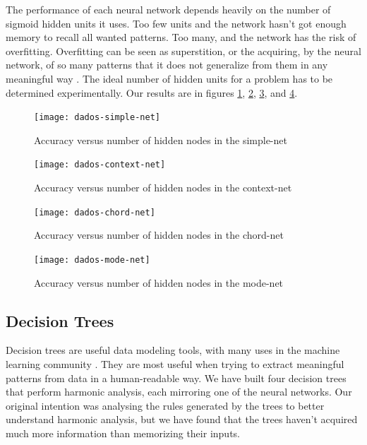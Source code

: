 \documentclass{article}
\begin{document}
The performance of each neural network depends heavily on the number
of sigmoid hidden units it uses. Too few units and the network hasn't
got enough memory to recall all wanted patterns. Too many, and the
network has the risk of overfitting. Overfitting can be seen as
superstition, or the acquiring, by the neural network, of so many
patterns that it does not generalize from them in any meaningful way
\cite{white95:superstitious}. The ideal number of hidden units for a
problem has to be determined experimentally. Our results are in
figures \ref{fig:simple-net}, \ref{fig:context-net},
\ref{fig:chord-net}, and \ref{fig:mode-net}.

\begin{figure}
  \texttt{[image: dados-simple-net]}
  \caption{Accuracy versus number of hidden nodes in the simple-net}
  \label{fig:simple-net}
\end{figure}

\begin{figure}
  \texttt{[image: dados-context-net]}
  \caption{Accuracy versus number of hidden nodes in the context-net}
  \label{fig:context-net}
\end{figure}

\begin{figure}
  \texttt{[image: dados-chord-net]}
  \caption{Accuracy versus number of hidden nodes in the chord-net}
  \label{fig:chord-net}
\end{figure}

\begin{figure}
  \texttt{[image: dados-mode-net]}
  \caption{Accuracy versus number of hidden nodes in the mode-net}
  \label{fig:mode-net}
\end{figure}

\subsection{Decision Trees}

Decision trees are useful data modeling tools, with many uses in the
machine learning community \cite{Mitchell:1997:ML}. They are most
useful when trying to extract meaningful patterns from data in a
human-readable way. We have built four decision trees that perform
harmonic analysis, each mirroring one of the neural networks. Our
original intention was analysing the rules generated by the trees to
better understand harmonic analysis, but we have found that the trees
haven't acquired much more information than memorizing their inputs.
\end{document}
